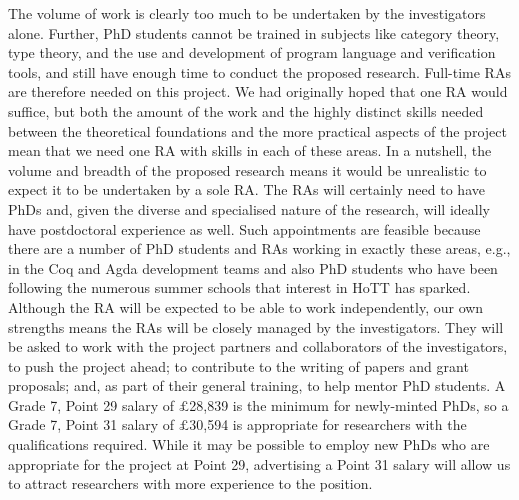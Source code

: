 \documentclass[a4paper,11pt]{article}
\begin{document}
 The volume of work is clearly too much to be
undertaken by the investigators alone. Further, PhD students cannot be
trained in subjects like category theory, type theory, and the use and
development of program language and verification tools, and still have
enough time to conduct the proposed research. Full-time RAs are
therefore needed on this project. We had originally hoped that one RA
would suffice, but both the amount of the work and the highly distinct
skills needed between the theoretical foundations and the more
practical aspects of the project mean that we need one RA with skills
in each of these areas. In a nutshell, the volume and breadth of the
proposed research means it would be unrealistic to expect it to be
undertaken by a sole RA. The RAs will certainly need to have PhDs and,
given the diverse and specialised nature of the research, will ideally
have postdoctoral experience as well.  Such appointments are feasible
because there are a number of PhD students and RAs working in exactly
these areas, e.g., in the Coq and Agda development teams and also PhD
students who have been following the numerous summer schools that
interest in HoTT has sparked.  Although the RA will be expected to be
able to work independently, our own strengths means the RAs will be
closely managed by the investigators. They will be asked to work with
the project partners and collaborators of the investigators, to push
the project ahead; to contribute to the writing of papers and grant
proposals; and, as part of their general training, to help mentor PhD
students. A Grade 7, Point 29 salary of $\pounds$28,839 is the minimum
for newly-minted PhDs, so a Grade 7, Point 31 salary of
$\pounds$30,594 is appropriate for researchers with the qualifications
required. While it may be possible to employ new PhDs who are
appropriate for the project at Point 29, advertising a Point 31 salary
will allow us to attract researchers with more experience to the
position.



\vspace{0.02in}
\end{document}
